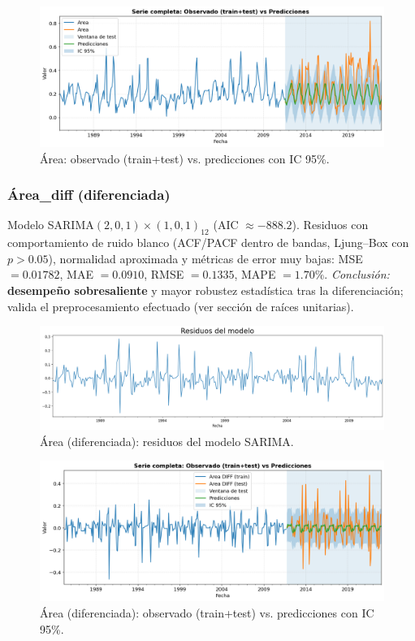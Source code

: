 \begin{figure}[H]\centering
\includegraphics[scale=.42]{Figures/pred_area.png}
\caption{Área: observado (train+test) vs. predicciones con IC 95\%.}
\label{fig:pred_area}
\end{figure}


\subsubsection{Área\_diff (diferenciada)}
Modelo SARIMA$(2,0,1)\times(1,0,1)_{12}$
(AIC $\approx -888.2$). Residuos con comportamiento de ruido blanco (ACF/PACF dentro
de bandas, Ljung--Box con $p>0.05$), normalidad aproximada y métricas de error muy bajas:
MSE $=0.01782$, MAE $=0.0910$, RMSE $=0.1335$, MAPE $=1.70\%$. 
\emph{Conclusión:} \textbf{desempeño sobresaliente} y mayor robustez estadística tras la
diferenciación; valida el preprocesamiento efectuado (ver sección de raíces unitarias).

\begin{figure}[H]\centering
\includegraphics[scale=.30]{Figures/res_sarima_area_d.png}
\caption{Área (diferenciada): residuos del modelo SARIMA.}
\label{fig:res_area_d}
\end{figure}


\begin{figure}[H]\centering
\includegraphics[scale=.42]{Figures/pred_area_d.png}
\caption{Área (diferenciada): observado (train+test) vs. predicciones con IC 95\%.}
\label{fig:pred_area_d}
\end{figure}





